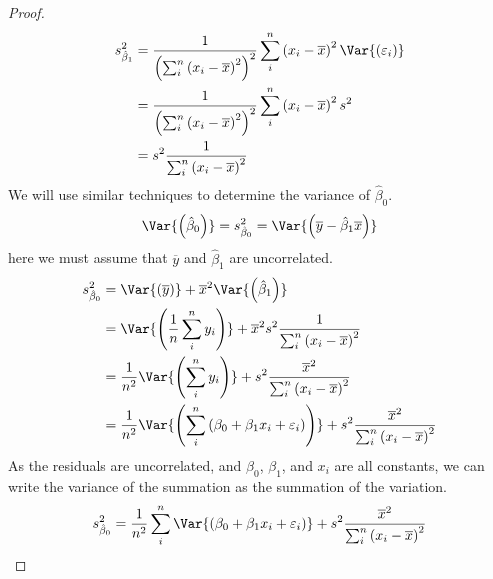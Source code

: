 \documentclass{article}
\begin{document}
\begin{proof}
    \begin{align*}
        s_{\hat{\beta}_1}^2 & = \frac{1}{\left( \sum_i^n \left( x_i - \overline{x} \right)^2 \right)^2} \sum_i^n \left( x_i - \overline{x} \right)^2 \Var{\left( \varepsilon_i \right)} \\
                            & = \frac{1}{\left( \sum_i^n \left( x_i - \overline{x} \right)^2 \right)^2} \sum_i^n \left( x_i - \overline{x} \right)^2 s^2                                \\
                            & = s^2 \frac{1}{\sum_i^n \left( x_i - \overline{x} \right)^2}
    \end{align*}
    We will use similar techniques to determine the variance of $\hat{\beta}_0$.
    \begin{equation*}
        \Var{\left( \hat{\beta}_0 \right)} = s_{\hat{\beta}_0}^2 = \Var{\left( \overline{y} - \hat{\beta}_1 \overline{x} \right)}
    \end{equation*}
    here we must assume that $\overline{y}$ and $\hat{\beta}_1$ are uncorrelated.
    \begin{align*}
        s_{\hat{\beta}_0}^2 & = \Var{\left( \overline{y} \right)} + \overline{x}^2 \Var{\left( \hat{\beta}_1 \right)}                                                                                   \\
                            & = \Var{\left( \frac{1}{n}\sum_i^ny_i \right)} + \overline{x}^2 s^2 \frac{1}{\sum_i^n \left( x_i - \overline{x} \right)^2}                                                 \\
                            & = \frac{1}{n^2}\Var{\left( \sum_i^ny_i \right)} + s^2 \frac{\overline{x}^2}{\sum_i^n \left( x_i - \overline{x} \right)^2}                                                 \\
                            & = \frac{1}{n^2}\Var{\left( \sum_i^n\left( \beta_0 + \beta_1x_i + \varepsilon_i \right) \right)} + s^2 \frac{\overline{x}^2}{\sum_i^n \left( x_i - \overline{x} \right)^2}
    \end{align*}
    As the residuals are uncorrelated, and $\beta_0$, $\beta_1$, and $x_i$ are all 
    constants, we can write the variance of the summation as the summation of the variation.
    \begingroup
    \allowdisplaybreaks
    \begin{align*}
        s_{\hat{\beta}_0}^2 & = \frac{1}{n^2} \sum_i^n\Var{\left( \beta_0 + \beta_1x_i + \varepsilon_i \right)} + s^2 \frac{\overline{x}^2}{\sum_i^n \left( x_i - \overline{x} \right)^2}                                                        \\

\end{align*}
\end{proof}
\end{document}
